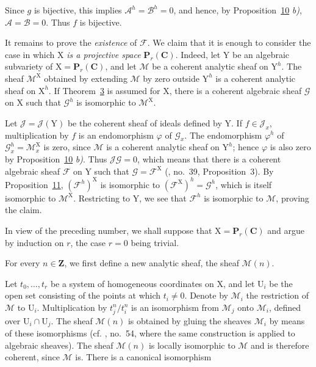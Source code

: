 Since $g$ is bijective, this implies $\mathcal{A}^h=\mathcal{B}^h=0$, and hence, by Proposition~\hyperref[gaga:prop:10]{10} \emph{b)}, $\mathcal{A}=\mathcal{B}=0$. Thus $f$ is bijective.

It remains to prove the \emph{existence} of $\mathcal{F}$. We claim that it is enough to consider the case in which $\mathrm{X}$ \emph{is a projective space} $\mathbf{P}_r(\mathbf{C})$. Indeed, let $\mathrm{Y}$ be an algebraic subvariety of $\mathrm{X}=\mathbf{P}_r(\mathbf{C})$, and let $\mathcal{M}$ be a coherent analytic sheaf on $\mathrm{Y}^h$. The sheaf $\mathcal{M}^\mathrm{X}$ obtained by extending $\mathcal{M}$ by zero outside $\mathrm{Y}^h$ is a coherent analytic sheaf on $\mathrm{X}^h$. If Theorem~\hyperref[gaga:thm:3]{3} is assumed for $\mathrm{X}$, there is a coherent algebraic sheaf $\mathcal{G}$ on $\mathrm{X}$ such that $\mathcal{G}^h$ is isomorphic to $\mathcal{M}^\mathrm{X}$.

Let $\mathcal{J}=\mathcal{J}(\mathrm{Y})$ be the coherent sheaf of ideals defined by $\mathrm{Y}$. If $f\in\mathcal{J}_x$, multiplication by $f$ is an endomorphism $\varphi$ of $\mathcal{G}_x$. The endomorphism $\varphi^h$ of $\mathcal{G}^h_x=\mathcal{M}^\mathrm{X}_x$ is zero, since $\mathcal{M}$ is a coherent analytic sheaf on $\mathrm{Y}^h$; hence $\varphi$ is also zero by Proposition~\hyperref[gaga:prop:10]{10} \emph{b)}. Thus $\mathcal{J}\mathcal{G}=0$, which means that there is a coherent algebraic sheaf $\mathcal{F}$ on $\mathrm{Y}$ such that $\mathcal{G}=\mathcal{F}^\mathrm{X}$ (, no.~39, Proposition~3). By Proposition~\hyperref[gaga:prop:11]{11}, $(\mathcal{F}^h)^\mathrm{X}$ is isomorphic to $(\mathcal{F}^\mathrm{X})^h=\mathcal{G}^h$, which is itself isomorphic to $\mathcal{M}^\mathrm{X}$. Restricting to $\mathrm{Y}$, we see that $\mathcal{F}^h$ is isomorphic to $\mathcal{M}$, proving the claim.


In view of the preceding number, we shall suppose that $\mathrm{X}=\mathbf{P}_r(\mathbf{C})$ and argue by induction on $r$, the case $r=0$ being trivial.

For every $n\in\mathbf{Z}$, we first define a new analytic sheaf, the sheaf $\mathcal{M}(n)$.

Let $t_0,\ldots,t_r$ be a system of homogeneous coordinates on $\mathrm{X}$, and let $\mathrm{U}_i$ be the open set consisting of the points at which $t_i\neq0$. Denote by $\mathcal{M}_i$ the restriction of $\mathcal{M}$ to $\mathrm{U}_i$. Multiplication by $t_j^n/t_i^n$ is an isomorphism from $\mathcal{M}_j$ onto $\mathcal{M}_i$, defined over $\mathrm{U}_i\cap \mathrm{U}_j$. The sheaf $\mathcal{M}(n)$ is obtained by gluing the sheaves $\mathcal{M}_i$ by means of these isomorphisms (cf. , no.~54, where the same construction is applied to algebraic sheaves). The sheaf $\mathcal{M}(n)$ is locally isomorphic to $\mathcal{M}$ and is therefore coherent, since $\mathcal{M}$ is. There is a canonical isomorphism


